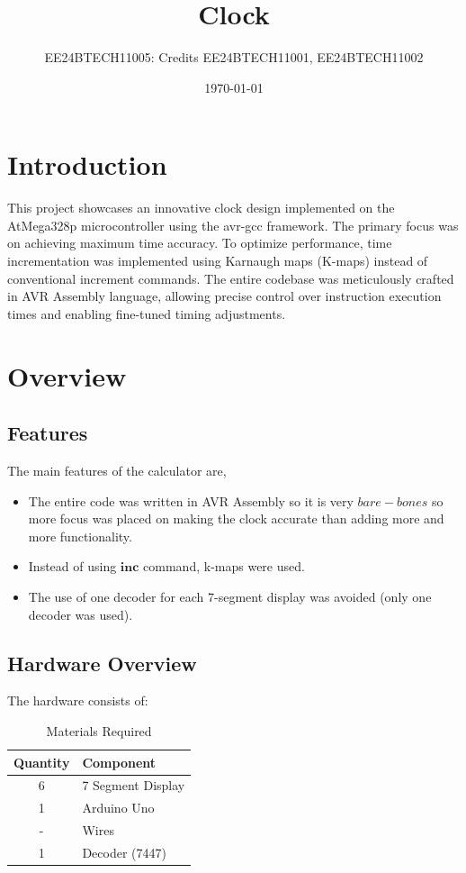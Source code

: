 \documentclass[a4paper,12pt]{article}
\title{Clock}
\author{EE24BTECH11005: Credits EE24BTECH11001, EE24BTECH11002}
\date{\today}
\begin{document}
\maketitle

\section*{Introduction}
This project showcases an innovative clock design implemented on the AtMega328p microcontroller using the avr-gcc framework. The primary focus was on achieving maximum time accuracy. To optimize performance, time incrementation was implemented using Karnaugh maps (K-maps) instead of conventional increment commands. The entire codebase was meticulously crafted in AVR Assembly language, allowing precise control over instruction execution times and enabling fine-tuned timing adjustments.

\section*{Overview}
\subsection*{Features}
The main features of the calculator are,
\begin{itemize}
    \item The entire code was written in AVR Assembly so it is very $bare-bones$ so more focus was placed on making the clock accurate than adding more and more functionality.
    \item Instead of using $\mathbf{inc}$ command, k-maps were used. 
    \item The use of one decoder for each 7-segment display was avoided (only one decoder was used).

\end{itemize}
\subsection*{Hardware Overview}


The hardware consists of:
\begin{table}[H]
\centering
\begin{tabular}{|c|l|}
\hline
\textbf{Quantity} & \textbf{Component} \\
\hline
6 & 7 Segment Display \\
\hline
1 & Arduino Uno\\
\hline
- & Wires \\
\hline
1 & Decoder (7447) \\
\hline
\end{tabular}
\caption{Materials Required}
\label{tab:materials}
\end{table}
\end{document}
